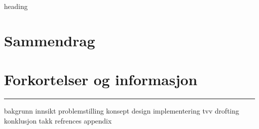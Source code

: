 \documentclass[a4paper,11pt,norsk]{article}
\begin{document}
{heading}
\section*{Sammendrag}
\section*{Forkortelser og informasjon}
\rule{\textwidth}{1pt}
{bakgrunn}
{innsikt}
{problemstilling}
{konsept}
{design}
{implementering}
{tvv}
{drofting}
{konklusjon}
{takk}
{refrences}
{appendix}
\end{document}

